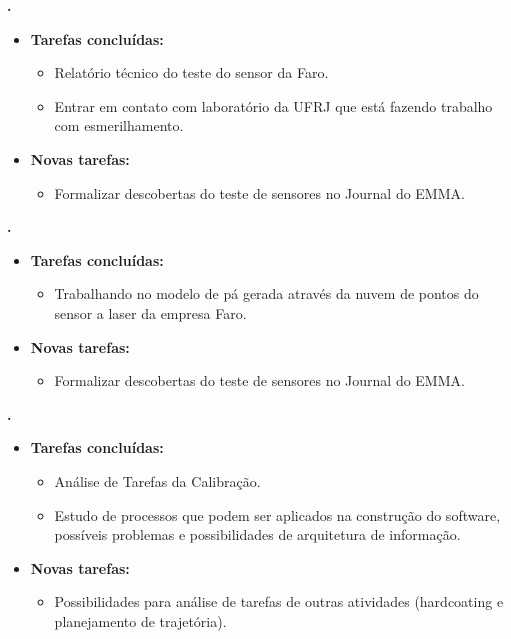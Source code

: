 	
	  \textbf{\elael.} 
	\begin{itemize}
		\item \textbf{Tarefas concluídas:}
			\begin{itemize}    
				\item Relatório técnico do teste do sensor da Faro.
				\item Entrar em contato com laboratório da UFRJ que está fazendo trabalho
				com esmerilhamento.
			\end{itemize}
		
		\item \textbf{Novas tarefas:}
			\begin{itemize} 
			    \item Formalizar descobertas do teste de sensores no Journal do EMMA.
			\end{itemize}
	\end{itemize}			
			
  \textbf{\renan.} 
	\begin{itemize}
		\item \textbf{Tarefas concluídas:}
			\begin{itemize}    
				\item Trabalhando no modelo de pá gerada através da nuvem de pontos do
				sensor a laser da empresa Faro.
			\end{itemize}
		
		\item \textbf{Novas tarefas:}
			\begin{itemize} 
			    \item Formalizar descobertas do teste de sensores no Journal do EMMA.
			\end{itemize}
	\end{itemize}	
			
   \textbf{\julia.} 
	\begin{itemize}
		\item \textbf{Tarefas concluídas:}
			\begin{itemize}    
				\item Análise de Tarefas da Calibração.
				\item Estudo de processos que podem ser aplicados na construção do software,
				possíveis problemas e possibilidades de arquitetura de informação.
			\end{itemize}
		
		\item \textbf{Novas tarefas:}
			\begin{itemize} 
			    \item Possibilidades para análise de tarefas de outras atividades
			    (hardcoating e planejamento de trajetória).
			\end{itemize}
	\end{itemize}		



